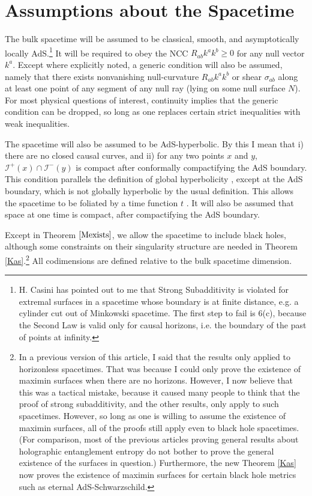 \documentclass[12pt]{article}
\begin{document}
\section{Assumptions about the Spacetime}

The bulk spacetime will be assumed to be classical, smooth, and asymptotically locally AdS.\footnote{H. Casini has pointed out to me that Strong Subadditivity is violated for extremal surfaces in a spacetime whose boundary is at finite distance, e.g. a cylinder cut out of Minkowski spacetime.  The first step to fail is 6(c), because the Second Law is valid only for causal horizons, i.e. the boundary of the past of points at infinity.}  It will be required to obey the NCC $R_{ab} k^a k^b \ge 0$ for any null vector $k^a$.  Except where explicitly noted, a generic condition will also be assumed, namely that there exists nonvanishing null-curvature $R_{ab} k^a k^b$ or shear $\sigma_{ab}$ along at least one point of any segment of any null ray (lying on some null surface $N$).  For most physical questions of interest, continuity implies that the generic condition can be dropped, so long as one replaces certain strict inequalities with weak inequalities.

The spacetime will also be assumed to be AdS-hyperbolic.  By this I mean that i) there are no closed causal curves, and ii) for any two points $x$ and $y$, $\mathcal{I}^+(x) \cap \mathcal{I}^-(y)$ is compact after conformally compactifying the AdS boundary.  This condition parallels the definition of global hyperbolicity \cite{BS07}, except at the AdS boundary, which is not globally hyperbolic by the usual definition.  This allows the spacetime to be foliated by a time function $t$ \cite{geroch67}.  It will also be assumed that space at one time is compact, after compactifying the AdS boundary.

Except in Theorem $\ref{Mexists}$, we allow the spacetime to include black holes, although some constraints on their singularity structure are needed in Theorem \ref{Kas}.\footnote{In a previous version of this article, I said that the results only applied to horizonless spacetimes.  That was because I could only prove the existence of maximin surfaces when there are no horizons.  However, I now believe that this was a tactical mistake, because it caused many people to think that the proof of strong subadditivity, and the other results, only apply to such spacetimes.  However, so long as one is willing to assume the existence of maximin surfaces, all of the proofs still apply even to black hole spacetimes.  (For comparison, most of the previous articles proving general results about holographic entanglement entropy do not bother to prove the general existence of the surfaces in question.)  Furthermore, the new Theorem \ref{Kas} now proves the existence of maximin surfaces for certain black hole metrics such as eternal AdS-Schwarzschild.} All codimensions are defined relative to the bulk spacetime dimension.
\end{document}
